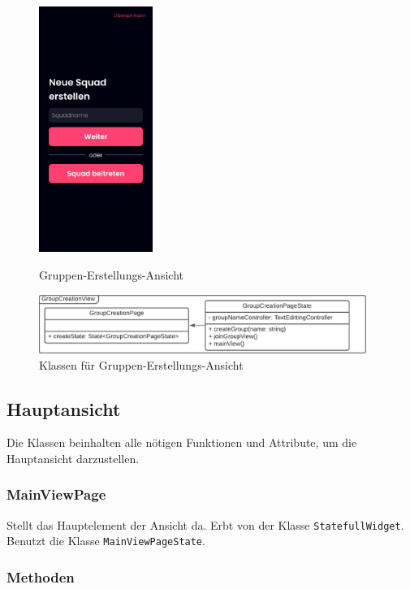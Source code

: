 \documentclass{entwurfsheft}
\begin{document}
    \begin{figure}[htp]
        \begin{minipage}
            [t]{0.49\textwidth}
            \centering
            \includegraphics[height=80mm]{images/Presentation-layer/GroupCreationView.jpg}
            \caption{Gruppen-Erstellungs-Ansicht}
        \end{minipage}
        \begin{minipage}
            [t]{0.49\textwidth}
            \centering
            \includegraphics[width=0.95\textwidth]{images/Presentation-layer/GroupCreationViewClass.pdf}
            \caption{Klassen für Gruppen-Erstellungs-Ansicht}
        \end{minipage}
    \end{figure} 
        
    \newpage

\subsection{Hauptansicht}
    Die Klassen beinhalten alle nötigen Funktionen und Attribute, um die Hauptansicht darzustellen.

    \subsubsection{MainViewPage}
        Stellt das Hauptelement der Ansicht da. Erbt von der Klasse \texttt{StatefullWidget}. Benutzt die Klasse \texttt{MainViewPageState}. 
        \subsubsection*{Methoden}
\end{document}
